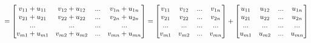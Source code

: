 \documentclass[12pt]{article}
\begin{document}
\begin{equation}\notag
    =
    \begin{bmatrix}
        v_{11} + u_{11}  & v_{12}+u_{12} & ... & v_{1n}+u_{1n} \\
        v_{21} + u_{21}  & v_{22}+u_{22} & ... & v_{2n}+u_{2n} \\
        ... & ... & ... &... \\       
        v_{m1} + u_{m1}  & v_{m2}+u_{m2} & ... & v_{mn}+u_{mn} 
      \end{bmatrix} = 
      \begin{bmatrix}
        v_{11}  & v_{12} & ... & v_{1n} \\
        v_{21}  & v_{22} & ... & v_{2n} \\
        ...  & ... & ... & ... \\
        v_{m1}  & v_{m2} & ... & v_{mn} 
      \end{bmatrix}
      +
      \begin{bmatrix}
        u_{11}  & u_{12} & ... & u_{1n} \\
        u_{21}  & u_{22} & ... & u_{2n} \\
        ...  & ... & ... & ... \\
        u_{m1}  & u_{m2} & ... & u_{mn} 
      \end{bmatrix}
\end{equation}
\end{document}
